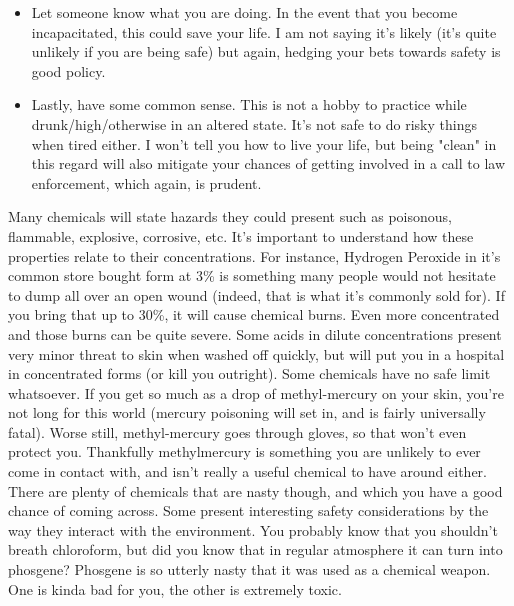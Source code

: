 \documentclass{book}
\begin{document}
\begin{itemize}
\item Let someone know what you are doing.  In the event that you become incapacitated, this could save your life.  I am not saying it's likely (it's quite unlikely if you are being safe) but again, hedging your bets towards safety is good policy.
\item Lastly, have some common sense.  This is not a hobby to practice while drunk/high/otherwise in an altered state.  It's not safe to do risky things when tired either.  I won't tell you how to live your life, but being "clean" in this regard will also mitigate your chances of getting involved in a call to law enforcement, which again, is prudent.
\end{itemize}

Many chemicals will state hazards they could present such as poisonous, flammable, explosive, corrosive, etc.  It's important to understand how these properties relate to their concentrations.  For instance, Hydrogen Peroxide in it's common store bought form at 3\% is something many people would not hesitate to dump all over an open wound (indeed, that is what it's commonly sold for).  If you bring that up to 30\%, it will cause chemical burns.  Even more concentrated and those burns can be quite severe.  Some acids in dilute concentrations present very minor threat to skin when washed off quickly, but will put you in a hospital in concentrated forms (or kill you outright).  Some chemicals have no safe limit whatsoever.  If you get so much as a drop of methyl-mercury on your skin, you're not long for this world (mercury poisoning will set in, and is fairly universally fatal).  Worse still, methyl-mercury goes through gloves, so that won't even protect you.  Thankfully methylmercury is something you are unlikely to ever come in contact with, and isn't really a useful chemical to have around either.  There are plenty of chemicals that are nasty though, and which you have a good chance of coming across.  Some present interesting safety considerations by the way they interact with the environment.  You probably know that you shouldn't breath chloroform, but did you know that in regular atmosphere it can turn into phosgene?  Phosgene is so utterly nasty that it was used as a chemical weapon.  One is kinda bad for you, the other is extremely toxic.\\
\\
\end{document}
